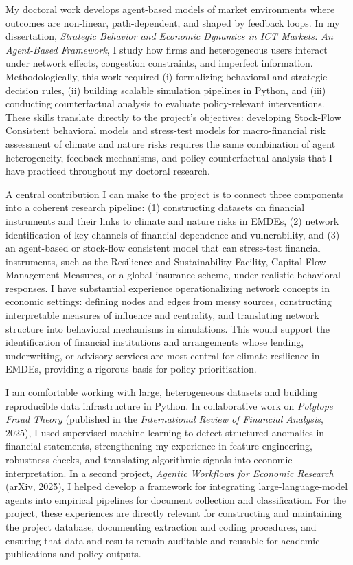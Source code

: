 \documentclass[11pt]{article}
\begin{document}
My doctoral work develops agent-based models of market environments where outcomes are non-linear, path-dependent, and shaped by feedback loops. 
In my dissertation, \emph{Strategic Behavior and Economic Dynamics in ICT Markets: An Agent-Based Framework}, 
I study how firms and heterogeneous users interact under network effects, congestion constraints, and imperfect information. 
Methodologically, this work required (i) formalizing behavioral and strategic decision rules, 
(ii) building scalable simulation pipelines in Python, and (iii) conducting counterfactual analysis to evaluate policy-relevant interventions. 
These skills translate directly to the project's objectives: developing Stock-Flow Consistent behavioral models and stress-test models for macro-financial risk assessment of climate and nature risks requires the same combination of agent heterogeneity, 
feedback mechanisms, and policy counterfactual analysis that I have practiced throughout my doctoral research.

A central contribution I can make to the project is to connect three components into a coherent research pipeline: 
(1) constructing datasets on financial instruments and their links to climate and nature risks in EMDEs, 
(2) network identification of key channels of financial dependence and vulnerability, 
and (3) an agent-based or stock-flow consistent model that can stress-test financial instruments, 
such as the Resilience and Sustainability Facility, Capital Flow Management Measures, or a global insurance scheme, 
under realistic behavioral responses. 
I have substantial experience operationalizing network concepts in economic settings: 
defining nodes and edges from messy sources, constructing interpretable measures of influence and centrality, 
and translating network structure into behavioral mechanisms in simulations. 
This would support the identification of financial institutions and arrangements whose lending, underwriting, 
or advisory services are most central for climate resilience in EMDEs, providing a rigorous basis for policy prioritization.

I am comfortable working with large, heterogeneous datasets and building reproducible data infrastructure in Python. 
In collaborative work on \emph{Polytope Fraud Theory} (published in the \emph{International Review of Financial Analysis}, 2025), 
I used supervised machine learning to detect structured anomalies in financial statements, 
strengthening my experience in feature engineering, robustness checks, and translating algorithmic signals into economic interpretation. 
In a second project, \emph{Agentic Workflows for Economic Research} (arXiv, 2025), 
I helped develop a framework for integrating large-language-model agents into empirical pipelines for document collection and classification. 
For the project, these experiences are directly relevant for constructing and maintaining the project database, documenting extraction and coding procedures, and ensuring that data and results remain auditable and reusable for academic publications and policy outputs.
\end{document}
